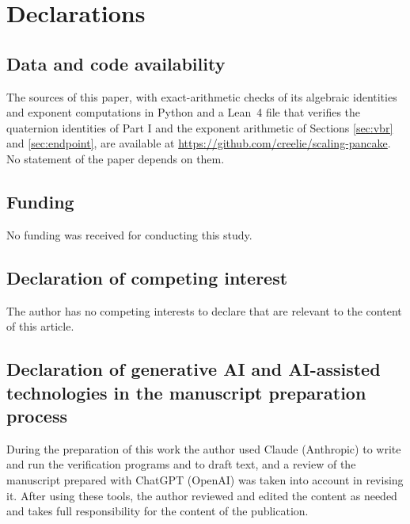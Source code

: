 \section*{Declarations}

\subsection*{Data and code availability}
The sources of this paper, with exact-arithmetic checks of its algebraic identities and exponent
computations in Python and a Lean~4 file that verifies the quaternion identities of Part I and the
exponent arithmetic of Sections \ref{sec:vbr} and \ref{sec:endpoint}, are available at \url{https://github.com/creelie/scaling-pancake}\releaseline.
No statement of the paper depends on them.

\subsection*{Funding}
No funding was received for conducting this study.

\subsection*{Declaration of competing interest}
The author has no competing interests to declare that are relevant to the content of this article.

\subsection*{Declaration of generative AI and AI-assisted technologies in the manuscript preparation process}
During the preparation of this work the author used Claude (Anthropic) to write and run the
verification programs and to draft text, and a review of the manuscript prepared with ChatGPT
(OpenAI) was taken into account in revising it. After using these tools, the author reviewed and edited the
content as needed and takes full responsibility for the content of the publication.
